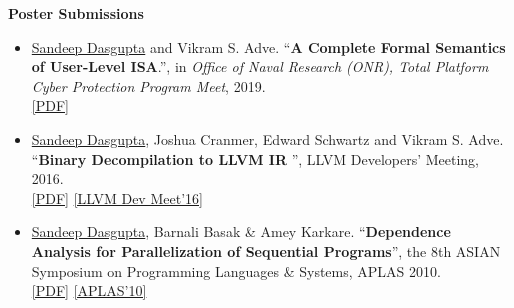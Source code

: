 \documentclass[9pt]{article}
\newenvironment{changemargin}[2]{%
  \begin{list}{}{%
    \setlength{\topsep}{0pt}%
    \setlength{\leftmargin}{#1}%
    \setlength{\rightmargin}{#2}%
    \setlength{\listparindent}{\parindent}%
    \setlength{\itemindent}{\parindent}%
    \setlength{\parsep}{\parskip}%
  }%
  \item[]}{\end{list}
}
\newenvironment{body} {
	\vspace*{-16pt}
	\begin{changemargin}{-0.25in}{-0.5in}
  }	
	{\end{changemargin}
}
\begin{document}
\begin{body}
\textbf{Poster Submissions}\\
	\vspace*{-4pt}
	\begin{itemize} \itemsep -0pt
                \item \underline{Sandeep Dasgupta} and Vikram S. Adve. ``\textbf{A Complete Formal Semantics of User-Level ISA}.'', in \emph{Office of Naval Research (ONR), Total Platform Cyber Protection Program Meet}, 2019. \\
  		\href{https://sdasgup3.github.io/files/onr-tpcp-19.pdf}{[PDF]}

                \item \underline{Sandeep Dasgupta}, Joshua Cranmer, Edward Schwartz and Vikram S. Adve. ``\textbf{Binary Decompilation to LLVM IR
                  }'', LLVM Developers' Meeting, 2016. \\
                  \href{https://sdasgup3.github.io/files/allin_poster.pdf}{[PDF]}
                  \href{https://llvm.org/devmtg/2016-11/}{[LLVM Dev Meet'16]}

                \item \underline{Sandeep Dasgupta}, Barnali Basak \& Amey Karkare. ``\textbf{Dependence Analysis for Parallelization of Sequential Programs}'', the 8th ASIAN
                  Symposium on Programming Languages \& Systems, APLAS 2010. \\
                  \href{https://sdasgup3.github.io/files/poster_APLAS2010.pdf}{[PDF]}
                  \href{https://basics.sjtu.edu.cn/conference/aplas2010/accepted_posters.htm}{[APLAS'10]}
	\end{itemize}


\end{body}
\end{document}
